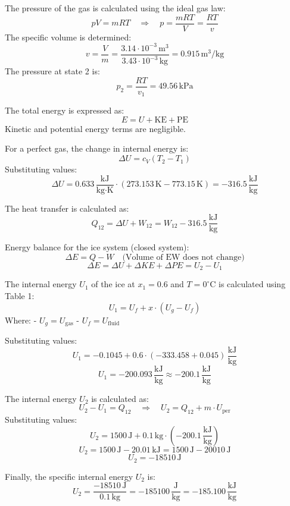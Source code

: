 The pressure of the gas is calculated using the ideal gas law:  
\[
pV = mRT \quad \Rightarrow \quad p = \frac{mRT}{V} = \frac{RT}{v}
\]  
The specific volume is determined:  
\[
v = \frac{V}{m} = \frac{3.14 \cdot 10^{-3} \, \text{m}^3}{3.43 \cdot 10^{-3} \, \text{kg}} = 0.915 \, \text{m}^3/\text{kg}
\]  
The pressure at state 2 is:  
\[
p_2 = \frac{RT}{v_1} = 49.56 \, \text{kPa}
\]

The total energy is expressed as:  
\[
E = U + \text{KE} + \text{PE}
\]  
Kinetic and potential energy terms are negligible.  

For a perfect gas, the change in internal energy is:  
\[
\Delta U = c_V (T_2 - T_1)
\]  
Substituting values:  
\[
\Delta U = 0.633 \, \frac{\text{kJ}}{\text{kg·K}} \cdot (273.153 \, \text{K} - 773.15 \, \text{K}) = -316.5 \, \frac{\text{kJ}}{\text{kg}}
\]

The heat transfer is calculated as:  
\[
Q_{12} = \Delta U + W_{12} = W_{12} - 316.5 \, \frac{\text{kJ}}{\text{kg}}
\]

Energy balance for the ice system (closed system):  
\[
\Delta E = Q - W \quad \text{(Volume of EW does not change)}
\]  
\[
\Delta E = \Delta U + \Delta KE + \Delta PE = U_2 - U_1
\]

The internal energy \( U_1 \) of the ice at \( x_1 = 0.6 \) and \( T = 0^\circ\text{C} \) is calculated using Table 1:  
\[
U_1 = U_f + x \cdot (U_g - U_f)
\]  
Where:  
- \( U_g = U_{\text{gas}} \)  
- \( U_f = U_{\text{fluid}} \)  

Substituting values:  
\[
U_1 = -0.1045 + 0.6 \cdot (-333.458 + 0.045) \, \frac{\text{kJ}}{\text{kg}}
\]  
\[
U_1 = -200.093 \, \frac{\text{kJ}}{\text{kg}} \approx -200.1 \, \frac{\text{kJ}}{\text{kg}}
\]

The internal energy \( U_2 \) is calculated as:  
\[
U_2 - U_1 = Q_{12} \quad \Rightarrow \quad U_2 = Q_{12} + m \cdot U_{\text{per}}
\]  
Substituting values:  
\[
U_2 = 1500 \, \text{J} + 0.1 \, \text{kg} \cdot (-200.1 \, \frac{\text{kJ}}{\text{kg}})
\]  
\[
U_2 = 1500 \, \text{J} - 20.01 \, \text{kJ} = 1500 \, \text{J} - 20010 \, \text{J}
\]  
\[
U_2 = -18510 \, \text{J}
\]

Finally, the specific internal energy \( U_2 \) is:  
\[
U_2 = \frac{-18510 \, \text{J}}{0.1 \, \text{kg}} = -185100 \, \frac{\text{J}}{\text{kg}} = -185.100 \, \frac{\text{kJ}}{\text{kg}}
\]